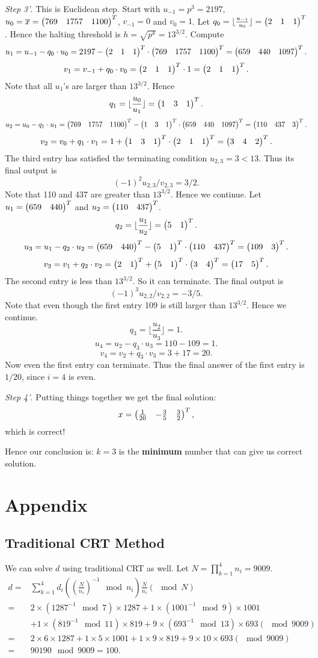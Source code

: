 \documentclass[12pt]{article}
\theoremstyle{plain}
\begin{document}
\emph{Step 3'}. This is Euclidean step. Start with $u_{-1} = p^3 = 2197$, $u_0=\overline{x} = \begin{pmatrix}769& 1757& 1100\end{pmatrix}^T$, $v_{-1} = 0$ and $v_0=1$. Let $q_0 = \lfloor \frac{u_{-1}}{u_0} \rfloor = \begin{pmatrix}2 & 1 & 1\end{pmatrix}^T$. Hence the halting threshold is $h = \sqrt{p^k} = 13^{3/2}$. Compute
$$u_1 = u_{-1} - q_0\cdot u_0 = 2197 - \begin{pmatrix}2 & 1 & 1\end{pmatrix}^T \cdot \begin{pmatrix}769 & 1757 & 1100\end{pmatrix}^T = \begin{pmatrix}659 & 440 & 1097\end{pmatrix}^T.$$
$$v_1 = v_{-1} + q_0\cdot v_0 = \begin{pmatrix}2 & 1 & 1\end{pmatrix}^T \cdot 1 = \begin{pmatrix}2 & 1 & 1\end{pmatrix}^T.$$
Note that all $u_1$'s are larger than $13^{3/2}$. Hence
$$q_1 = \lfloor \frac{u_0}{u_1} \rfloor = \begin{pmatrix}1 & 3 & 1\end{pmatrix}^T.$$
$$u_2 = u_0 - q_1\cdot u_1 = \begin{pmatrix}769&1757&1100\end{pmatrix}^T - \begin{pmatrix}1 & 3 & 1\end{pmatrix}^T \cdot \begin{pmatrix}659 & 440 & 1097\end{pmatrix}^T = \begin{pmatrix}110 & 437 & 3\end{pmatrix}^T.$$
$$v_2 = v_0 + q_1\cdot v_1 = 1 + \begin{pmatrix}1 & 3 & 1\end{pmatrix}^T \cdot \begin{pmatrix}2 & 1 & 1\end{pmatrix}^T = \begin{pmatrix}3&4&2\end{pmatrix}^T.$$
The third entry has satisfied the terminating condition $u_{2,3} = 3 < 13$. Thus its final output is 
$$(-1)^2u_{2,3}/v_{2,3} = 3/2.$$
Note that 110 and 437 are greater than $13^{3/2}$. Hence we continue. Let $u_1 = \begin{pmatrix}659 & 440\end{pmatrix}^T$ and $u_2 = \begin{pmatrix}110 & 437\end{pmatrix}^T$.
$$q_2 = \lfloor \frac{u_1}{u_2} \rfloor = \begin{pmatrix}5 & 1\end{pmatrix}^T.$$
$$u_3 = u_1 - q_2\cdot u_2 = \begin{pmatrix}659 & 440\end{pmatrix}^T - \begin{pmatrix}5 & 1\end{pmatrix}^T \cdot \begin{pmatrix}110 & 437\end{pmatrix}^T = \begin{pmatrix}109 & 3\end{pmatrix}^T.$$
$$v_3 = v_1 + q_2\cdot v_2 = \begin{pmatrix}2 & 1\end{pmatrix}^T + \begin{pmatrix}5 & 1\end{pmatrix}^T \cdot \begin{pmatrix}3&4\end{pmatrix}^T = \begin{pmatrix}17 & 5\end{pmatrix}^T.$$
The second entry is less than $13^{3/2}$. So it can terminate. The final output is 
$$(-1)^3u_{2,2}/v_{2,2} = -3/5.$$
Note that even though the first entry 109 is still larger than $13^{3/2}$. Hence we continue. 
$$q_3 = \lfloor \frac{u_2}{u_3} \rfloor = 1.$$
$$u_4 = u_2 - q_3\cdot u_3 = 110 - 109 = 1.$$
$$v_4 = v_2 + q_3\cdot v_3 = 3 + 17 = 20.$$
Now even the first entry can terminate. Thus the final answer of the first entry is $1/20$, since $i=4$ is even.

\emph{Step 4'}. Putting things together we get the final solution:
$$x = \begin{pmatrix}\frac{1}{20} & -\frac{3}{5} & \frac{3}{2}\end{pmatrix}^T,$$
which is correct!

Hence our conclusion is: $k=3$ is the {\bf minimum} number that can give us correct solution.

\section{Appendix}
\subsection{Traditional CRT Method}
We can solve $d$ using traditional CRT as well. 
Let $N = \prod_{k=1}^4 n_i = 9009$.
$$\begin{aligned}
d =& \sum_{k=1}^4 d_i \left(\left(\frac{N}{n_i}\right)^{-1} \mod n_i \right) \frac{N}{n_i}  (\mod N)\\
=& 2\times(1287^{-1} \mod 7)\times 1287 + 1\times(1001^{-1} \mod 9)\times 1001 \\
&+ 1\times(819^{-1} \mod 11)\times 819 + 9\times(693^{-1} \mod 13)\times 693 (\mod 9009)\\
=& 2\times 6\times 1287 + 1\times 5\times 1001 + 1\times 9\times 819 + 9\times 10\times 693 (\mod 9009)\\
=& 90190 \mod 9009 = 100.
\end{aligned}$$
\end{document}
